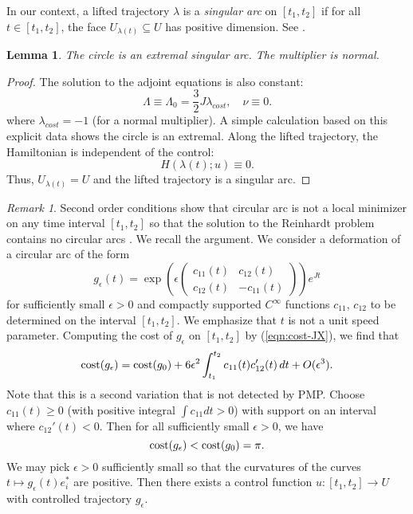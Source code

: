 \documentclass{article}
\newtheorem{lemma}[theorem]{Lemma}
\theoremstyle{remark}
\newtheorem{remark}[equation]{Remark}%
\newcommand{\op}[1]{\hbox{#1}}
\newcommand\ee[1]{e_{#1}^*}
\begin{document}
In our context, a lifted trajectory $\lambda$ is a {\it singular arc}
on $[t_1,t_2]$ if for all $t\in[t_1,t_2]$, the face
$U_{\lambda(t)}\subseteq U$ has positive dimension.  See
\cite[\S4.4.3]{liberzon2012calculus}.


\begin{lemma} The circle is an extremal singular arc.  The multiplier
  is normal.
\end{lemma}

\begin{proof}  The solution to the adjoint equations is also constant:
\begin{equation}\label{eqn:adj-circle}
\Lambda \equiv \Lambda_0=\frac{3}{2} J\lambda_{cost},
\quad \nu\equiv 0.
\end{equation}
where $\lambda_{cost}=-1$ (for a normal multiplier).  A simple calculation
based on this explicit data shows the circle is an extremal.  Along
the lifted trajectory, the Hamiltonian is independent of the control:
\[
H(\lambda(t);u)\equiv 0.
\]
Thus, $U_{\lambda(t)}=U$ and the lifted trajectory is a singular arc.
\end{proof}

\begin{remark}
  Second order conditions show that circular arc is not a local
  minimizer on any time interval $[t_1,t_2]$ so that the solution to
  the Reinhardt problem contains no circular arcs
  \cite[\S5.2]{hales2011reinhardt}.  We recall the argument.
  We consider a deformation of
  a circular arc of the form
\[
g_\epsilon(t) = \exp\left(\epsilon 
\begin{pmatrix}c_{11}(t) & c_{12}(t)\\ c_{12}(t) & -c_{11}(t)
\end{pmatrix}
\right) e^{J t}
\]
for sufficiently small $\epsilon>0$ and compactly supported $C^\infty$
functions $c_{11}$, $c_{12}$ to be determined on the interval
$[t_1,t_2]$.  We emphasize that $t$ is not a unit speed parameter.
Computing the cost of $g_\epsilon$ on $[t_1,t_2]$ by
(\ref{eqn:cost-JX}), we find that
\[
\op{cost}(g_\epsilon) = \op{cost}(g_0) + 
6 \epsilon^2 \int_{t_1}^{t_2} c_{11}(t) c_{12}'(t)\,dt + O(\epsilon^3).
\]
Note that this is a second variation that is not detected by PMP.
Choose $c_{11}(t)\ge0 $ (with positive integral $\int c_{11} dt>0$)
with support on an interval where $c_{12}'(t)<0$.  Then for all
sufficiently small $\epsilon>0$, we have
\[
\op{cost}(g_\epsilon) < \op{cost}(g_0)=\pi.
\]
We may pick $\epsilon>0$ sufficiently small so that the curvatures of
the curves $t\mapsto g_\epsilon(t)\ee{i}$ are positive.  Then there
exists a control function $u:[t_1,t_2]\to U$ with controlled
trajectory $g_\epsilon$.
\end{remark}
\end{document}
